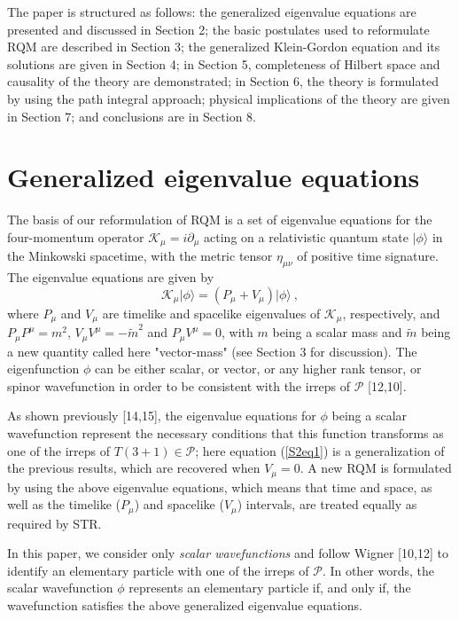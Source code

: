 \documentclass[12pt]{iopart}
\begin{document}
The paper is structured as follows: the generalized eigenvalue equations are 
presented and discussed in Section 2; the basic postulates used to reformulate
RQM are described in Section 3; the generalized Klein-Gordon equation and 
its solutions are given in Section 4; in Section 5, completeness of Hilbert 
space and causality of the theory are demonstrated; in Section 6, the theory
is formulated by using the path integral approach; physical implications of 
the theory are given in Section 7; and conclusions are in Section 8.
%


\section{Generalized eigenvalue equations}

The basis of our reformulation of RQM is a set of eigenvalue equations for the 
four-momentum operator $\mathcal{K}_{\mu} = i \partial_{\mu}$ acting 
on a relativistic quantum state $|\phi\rangle$ in the Minkowski spacetime, 
with the metric tensor $\eta_{\mu \nu}$ of positive time signature. The 
eigenvalue equations are given by 
%
    \begin{equation}
        \mathcal{K}_{\mu}|\phi\rangle=\left(P_{\mu} + V_{\mu}\right)\vert\phi\rangle\ ,
        \label{S2eq1}
    \end{equation}
%
where $P_{\mu}$ and $V_{\mu}$ are timelike and spacelike eigenvalues of 
$\mathcal{K}_{\mu}$, respectively, and $P_\mu P^\mu=m^2$, $V_\mu 
V^\mu=-\tilde{m}^2$ and $P_\mu V^\mu=0$, with $m$ being a scalar
mass and $\tilde{m}$ being a new quantity called here  "vector-mass" (see 
Section 3 for discussion).  The eigenfunction $\phi$ can be either scalar, 
or vector, or any higher rank tensor, or spinor wavefunction in order to 
be consistent with the irreps of $\mathcal {P}$ [12,10].  

As shown previously [14,15], the eigenvalue equations for $\phi$ being 
a scalar wavefunction represent the necessary conditions that this function 
transforms as one of the irreps of $T(3+1) \in \mathcal {P}$; here equation 
(\ref{S2eq1}) is a generalization of the previous results, which are 
recovered when $V_{\mu} = 0$.  A new RQM is formulated by using 
the above eigenvalue equations, which means that time and space, as 
well as the timelike ($P_{\mu}$) and spacelike ($V_{\mu}$) intervals, 
are treated equally as required by STR.

In this paper, we consider only {\it scalar wavefunctions} and follow
Wigner [10,12] to identify an elementary particle with one of the irreps
of $\mathcal {P}$.  In other words, the scalar wavefunction $\phi$
represents an elementary particle if, and only if, the wavefunction 
satisfies the above generalized eigenvalue equations.
\end{document}
